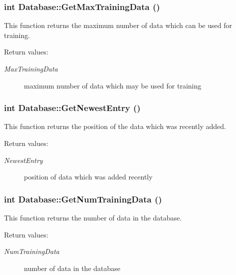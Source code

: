 \subsubsection{\setlength{\rightskip}{0pt plus 5cm}int Database::Get\-Max\-Training\-Data ()}\label{classDatabase_a11}


This function returns the maximum number of data which can be used for training.

\begin{Desc}
\item[Return values: ]\par
\begin{description}
\item[{\em 
Max\-Training\-Data}]maximum number of data which may be used for training \end{description}
\end{Desc}
\subsubsection{\setlength{\rightskip}{0pt plus 5cm}int Database::Get\-Newest\-Entry ()}\label{classDatabase_a14}


This function returns the position of the data which was recently added.

\begin{Desc}
\item[Return values: ]\par
\begin{description}
\item[{\em 
Newest\-Entry}]position of data which was added recently \end{description}
\end{Desc}
\subsubsection{\setlength{\rightskip}{0pt plus 5cm}int Database::Get\-Num\-Training\-Data ()}\label{classDatabase_a10}


This function returns the number of data in the database.

\begin{Desc}
\item[Return values: ]\par
\begin{description}
\item[{\em 
Num\-Training\-Data}]number of data in the database \end{description}
\end{Desc}
